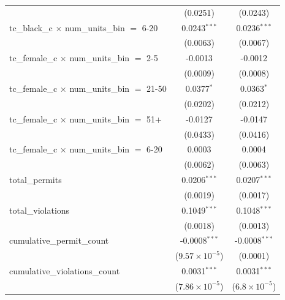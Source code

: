 \begin{tabular}{lcc}
                                                         & (0.0251)                & (0.0243)\\   
   tc\_black\_c $\times$ num\_units\_bin $=$ 6-20        & 0.0243$^{***}$          & 0.0236$^{***}$\\   
                                                         & (0.0063)                & (0.0067)\\   
   tc\_female\_c $\times$ num\_units\_bin $=$ 2-5        & -0.0013                 & -0.0012\\   
                                                         & (0.0009)                & (0.0008)\\   
   tc\_female\_c $\times$ num\_units\_bin $=$ 21-50      & 0.0377$^{*}$            & 0.0363$^{*}$\\   
                                                         & (0.0202)                & (0.0212)\\   
   tc\_female\_c $\times$ num\_units\_bin $=$ 51+        & -0.0127                 & -0.0147\\   
                                                         & (0.0433)                & (0.0416)\\   
   tc\_female\_c $\times$ num\_units\_bin $=$ 6-20       & 0.0003                  & 0.0004\\   
                                                         & (0.0062)                & (0.0063)\\   
   total\_permits                                        & 0.0206$^{***}$          & 0.0207$^{***}$\\   
                                                         & (0.0019)                & (0.0017)\\   
   total\_violations                                     & 0.1049$^{***}$          & 0.1048$^{***}$\\   
                                                         & (0.0018)                & (0.0013)\\   
   cumulative\_permit\_count                             & -0.0008$^{***}$         & -0.0008$^{***}$\\   
                                                         & ($9.57\times 10^{-5}$)  & (0.0001)\\   
   cumulative\_violations\_count                         & 0.0031$^{***}$          & 0.0031$^{***}$\\   
                                                         & ($7.86\times 10^{-5}$)  & ($6.8\times 10^{-5}$)\\    

\end{tabular}
